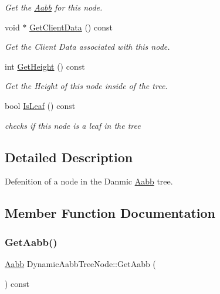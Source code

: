 \begin{DoxyCompactItemize}
\begin{DoxyCompactList}\small\item\em Get the \hyperlink{classAabb}{Aabb} for this node. \end{DoxyCompactList}\item 
void $\ast$ \hyperlink{classDynamicAabbTreeNode_a9c1101785913748b9f5e64b0842425a5}{Get\+Client\+Data} () const
\begin{DoxyCompactList}\small\item\em Get the Client Data associated with this node. \end{DoxyCompactList}\item 
int \hyperlink{classDynamicAabbTreeNode_ac36d17b0d2fe72b0cbfe513e54995ac2}{Get\+Height} () const
\begin{DoxyCompactList}\small\item\em Get the Height of this node inside of the tree. \end{DoxyCompactList}\item 
bool \hyperlink{classDynamicAabbTreeNode_acc87f07be4469f565cb57928b9f06c5a}{Is\+Leaf} () const
\begin{DoxyCompactList}\small\item\em checks if this node is a leaf in the tree \end{DoxyCompactList}\end{DoxyCompactItemize}


\subsection{Detailed Description}
Defenition of a node in the Danmic \hyperlink{classAabb}{Aabb} tree. 

\subsection{Member Function Documentation}
\mbox{\label{classDynamicAabbTreeNode_a63dd9923f939cd475b90568a949e9831}} 
\subsubsection{\texorpdfstring{Get\+Aabb()}{GetAabb()}}
{\footnotesize\ttfamily \hyperlink{classAabb}{Aabb} Dynamic\+Aabb\+Tree\+Node\+::\+Get\+Aabb (\begin{DoxyParamCaption}{ }\end{DoxyParamCaption}) const}



